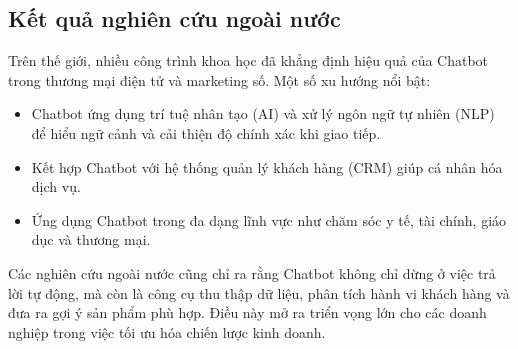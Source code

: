 \subsection{Kết quả nghiên cứu ngoài nước}
Trên thế giới, nhiều công trình khoa học đã khẳng định hiệu quả của Chatbot trong thương mại điện tử và marketing số. Một số xu hướng nổi bật:
\begin{itemize}
    \item Chatbot ứng dụng trí tuệ nhân tạo (AI) và xử lý ngôn ngữ tự nhiên (NLP) để hiểu ngữ cảnh và cải thiện độ chính xác khi giao tiếp.
    \item Kết hợp Chatbot với hệ thống quản lý khách hàng (CRM) giúp cá nhân hóa dịch vụ.
    \item Ứng dụng Chatbot trong đa dạng lĩnh vực như chăm sóc y tế, tài chính, giáo dục và thương mại.
\end{itemize}

Các nghiên cứu ngoài nước cũng chỉ ra rằng Chatbot không chỉ dừng ở việc trả lời tự động, mà còn là công cụ thu thập dữ liệu, phân tích hành vi khách hàng và đưa ra gợi ý sản phẩm phù hợp. Điều này mở ra triển vọng lớn cho các doanh nghiệp trong việc tối ưu hóa chiến lược kinh doanh.


